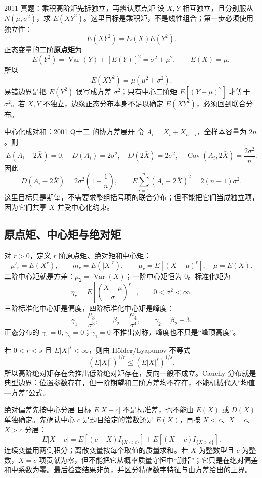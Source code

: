 \documentclass[11pt,a4paper]{ctexart}
\begin{document}
\begin{examplebox}{2011 真题：乘积高阶矩先拆独立，再辨认原点矩}
设 $X,Y$ 相互独立，且分别服从 $N(\mu,\sigma^2)$，求 $E(XY^2)$。这里目标是乘积矩，不是线性组合；第一步必须使用独立性：
\[
E(XY^2)=E(X)E(Y^2).
\]
正态变量的二阶\textbf{原点矩}为
\[
E(Y^2)=\operatorname{Var}(Y)+[E(Y)]^2=\sigma^2+\mu^2,
\qquad E(X)=\mu,
\]
所以
\[
\boxed{E(XY^2)=\mu(\mu^2+\sigma^2)}.
\]
易错边界是把 $E(Y^2)$ 误写成方差 $\sigma^2$；只有中心二阶矩 $E[(Y-\mu)^2]$ 才等于 $\sigma^2$。若 $X,Y$ 不独立，边缘正态分布本身不足以确定 $E(XY^2)$，必须回到联合分布。
\end{examplebox}

\begin{examplebox}{中心化成对和：2001 Q十二 的协方差展开}
令 $A_i=X_i+X_{n+i}$，全样本容量为 $2n$。则
\[
E(A_i-2\bar X)=0,\quad D(A_i)=2\sigma^2,\quad D(2\bar X)=2\sigma^2,
\quad \operatorname{Cov}(A_i,2\bar X)=\frac{2\sigma^2}{n}.
\]
因此
\[
D(A_i-2\bar X)=2\sigma^2\left(1-\frac1n\right),
\qquad
E\sum_{i=1}^n(A_i-2\bar X)^2=2(n-1)\sigma^2.
\]
这里目标只是期望，不需要求整组括号项的联合分布；但不能把它们当成独立项，因为它们共享 $\bar X$ 并受中心化约束。
\end{examplebox}

\subsection{原点矩、中心矩与绝对矩}

对 $r>0$，定义 $r$ 阶原点矩、绝对矩和中心矩：
\[
\mu'_r=E(X^r),\qquad m_r=E(\lvert X\rvert^r),\qquad
\mu_r=E[(X-\mu)^r],\quad \mu=E(X).
\]
二阶中心矩就是方差：$\mu_2=\operatorname{Var}(X)$；一阶中心矩恒为 $0$。标准化矩为
\[
\eta_r=E\left[\left(\frac{X-\mu}{\sigma}\right)^r\right],\qquad 0<\sigma^2<\infty.
\]
三阶标准化中心矩是偏度，四阶标准化中心矩是峰度：
\[
\gamma_1=\frac{\mu_3}{\sigma^3},\qquad
\beta_2=\frac{\mu_4}{\sigma^4},\qquad \gamma_2=\beta_2-3.
\]
正态分布的 $\gamma_1=0,\gamma_2=0$；$\gamma_1=0$ 不推出对称，峰度也不只是“峰顶高度”。

若 $0<r<s$ 且 $E\lvert X\rvert^s<\infty$，则由 Hölder/Lyapunov 不等式
\[
\left(E\lvert X\rvert^r\right)^{1/r}\leq\left(E\lvert X\rvert^s\right)^{1/s}.
\]
所以高阶绝对矩存在会推出低阶绝对矩存在，反向一般不成立。Cauchy 分布就是典型边界：位置参数存在，但一阶期望和二阶方差均不存在，不能机械代入“均值—方差”公式。

\begin{methodbox}{绝对偏差先按中心分层}
目标 $E\lvert X-c\rvert$ 不是标准差，也不能由 $E(X)$ 或 $D(X)$ 单独确定。先确认中心 $c$ 是题目给定的常数还是 $E(X)$，再按 $X<c$、$X=c$、$X>c$ 分层：
\[
E\lvert X-c\rvert=E[(c-X)I_{\{X<c\}}]+E[(X-c)I_{\{X>c\}}].
\]
连续变量用两侧积分；离散变量按每个取值的质量求和。若 $X$ 为整数型且 $c$ 为整数，$X=c$ 项贡献为零，但不能把它从概率质量守恒中“删掉”；它只是在绝对偏差和中系数为零。最后检查结果非负，并区分精确数字特征与由方差给出的上界。
\end{methodbox}
\end{document}
